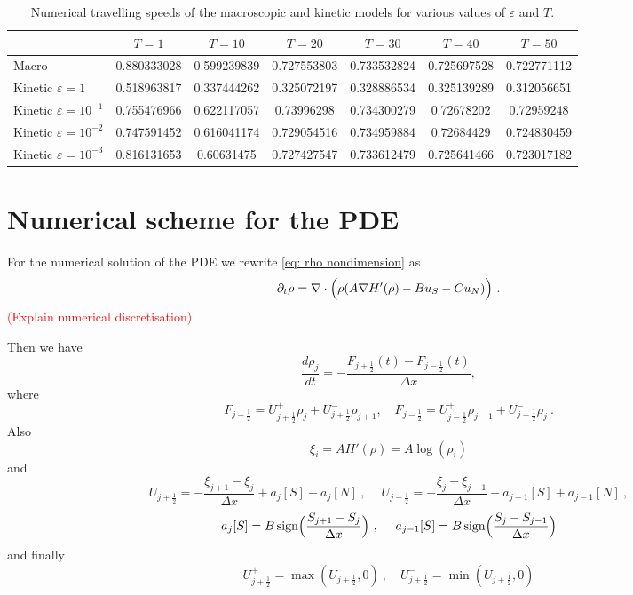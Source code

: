 \documentclass[11pt,twoside]{article}
\DeclareMathOperator{\sign}{sign}
\numberwithin{equation}{section}
\begin{document}
\begin{table}[h]
    \centering
    \begin{tabular}{|l|c|c|c|c|c|c|}
        \hline
         & $T=1$ & $T=10$ & $T=20$ & $T=30$ & $T=40$ & $T=50$ \\
        \hline
        Macro & 0.880333028 & 0.599239839 & 0.727553803 & 0.733532824 & 0.725697528 & 0.722771112 \\
        Kinetic $\varepsilon=1$ & 0.518963817 & 0.337444262 & 0.325072197 & 0.328886534 & 0.325139289 & 0.312056651 \\
        Kinetic $\varepsilon=10^{-1}$ & 0.755476966 & 0.622117057 & 0.73996298 & 0.734300279 & 0.72678202 & 0.72959248 \\
        Kinetic $\varepsilon=10^{-2}$ & 0.747591452 & 0.616041174 & 0.729054516 & 0.734959884 & 0.72684429 & 0.724830459 \\
        Kinetic $\varepsilon=10^{-3}$ & 0.816131653 & 0.60631475 & 0.727427547 & 0.733612479 & 0.725641466 & 0.723017182 \\
        \hline
    \end{tabular}
    \caption{Numerical travelling speeds of the macroscopic and kinetic models for various values of $\varepsilon$ and $T$.}
    \label{tab:travel_speed}
\end{table}

\appendix

\section{Numerical scheme for the PDE}
For the numerical solution of the PDE we rewrite \eqref{eq: rho nondimension} as
\begin{equation}
    \partial_t\rho=\nabla\cdot\Bigl(\rho(A\nabla H'(\rho)-Bu_S-Cu_N)\Bigr)\ .
\end{equation}
\textcolor{red}{(Explain numerical discretisation)}

Then we have
\begin{equation}
\frac{d\rho_j}{dt}=-\frac{F_{j+\frac{1}{2}}(t)-F_{j-\frac{1}{2}}(t)}{\Delta x},
\end{equation}
where
\begin{equation}
F_{j+\frac{1}{2}}=U^+_{j+\frac{1}{2}}\rho_j+U^-_{j+\frac{1}{2}}\rho_{j+1}, \quad  F_{j-\frac{1}{2}}=U^+_{j-\frac{1}{2}}\rho_{j-1}+U^-_{j-\frac{1}{2}}\rho_j\ .
\end{equation}
Also
\[
\xi_i=AH'(\rho)=A\log(\rho_i)
\]
and
\begin{equation}
    U_{j+\frac{1}{2}}=-\frac{\xi_{j+1}-\xi_j}{\Delta x}+a_j[S]+a_j[N]\ ,\ \quad    U_{j-\frac{1}{2}}=-\frac{\xi_{j}-\xi_{j-1}}{\Delta x}+a_{j-1}[S]+a_{j-1}[N]\ ,
\end{equation}
\[
a_j[S]=B\sign\Bigl( \frac{S_{j+1}-S_j}{\Delta x}\Bigr)\ ,\ \quad a_{j-1}[S]=B\sign\Bigl( \frac{S_{j}-S_{j-1}}{\Delta x}\Bigr)
\]
and finally
\begin{equation}
    U_{j+\frac{1}{2}}^+=\max(U_{j+\frac{1}{2}},0)\ ,\quad U_{j+\frac{1}{2}}^-=\min(U_{j+\frac{1}{2}},0)
\end{equation}
\end{document}
